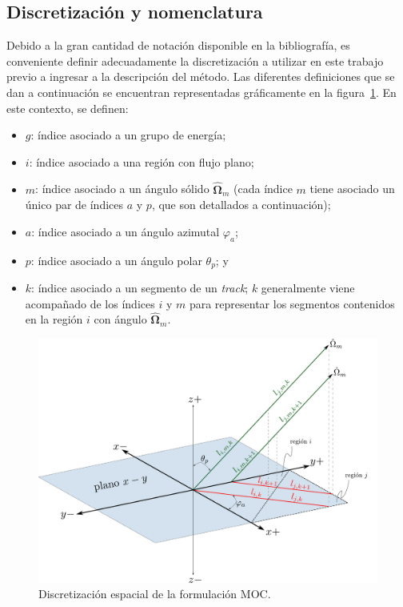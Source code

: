 \documentclass[11pt]{article}
\begin{document}
\subsection{Discretización y nomenclatura}

Debido a la gran cantidad de notación disponible en la bibliografía, es conveniente definir adecuadamente la discretización a utilizar en este trabajo previo a ingresar a la descripción del método. Las diferentes definiciones que se dan a continuación se encuentran representadas gráficamente en la figura~\ref{fig:coords-indices}. En este contexto, se definen:

\begin{itemize}
\renewcommand\labelitemi{$\cdot$}
 \item $g$: índice asociado a un grupo de energía;
 \item $i$: índice asociado a una región con flujo plano;
 \item $m$: índice asociado a un ángulo s\'olido $\boldsymbol{\hat{\Omega}}_m$ (cada índice $m$ tiene asociado un único par de índices $a$ y $p$, que son detallados a continuación);
 \item $a$: índice asociado a un ángulo azimutal $\varphi_a$;
 \item $p$: índice asociado a un ángulo polar $\theta_p$; y
 \item $k$: índice asociado a un segmento de un \emph{track}; $k$ generalmente viene acompañado de los índices $i$ y $m$ para representar los segmentos contenidos en la región $i$ con ángulo $\boldsymbol{\hat{\Omega}}_m$.
\end{itemize}

\begin{figure}[!h]
 \begin{center}
  \includegraphics[width=1.0\linewidth]{coords-indices-2.pdf}
 \end{center}
\caption{\label{fig:coords-indices} Discretización espacial de la formulación MOC.}
\end{figure}
\end{document}

